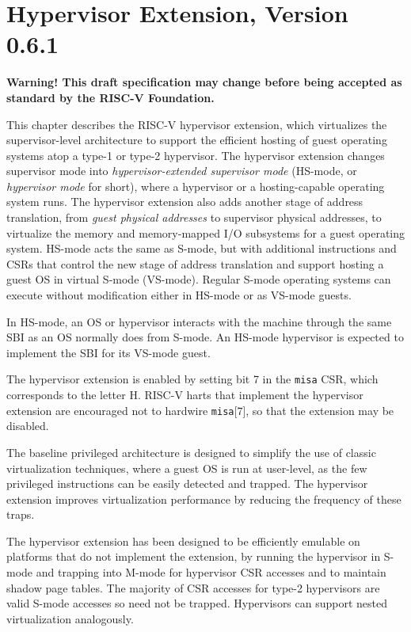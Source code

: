 \chapter{Hypervisor Extension, Version 0.6.1}
\label{hypervisor}

{\bf Warning! This draft specification may change before being
accepted as standard by the RISC-V Foundation.}

This chapter describes the RISC-V hypervisor extension, which virtualizes the
supervisor-level architecture to support the efficient hosting of guest
operating systems atop a type-1 or type-2 hypervisor.
The hypervisor extension changes supervisor mode into
{\em hypervisor-extended supervisor mode} (HS-mode, or {\em hypervisor
mode} for short), where a hypervisor or a hosting-capable operating system
runs.  The hypervisor extension also adds another stage of address translation,
from {\em guest physical addresses} to supervisor physical addresses,
to virtualize the
memory and memory-mapped I/O subsystems for a guest operating system.  HS-mode
acts the same as S-mode, but with additional instructions and CSRs that control
the new stage of address translation and support hosting a guest OS in virtual
S-mode (VS-mode).
Regular S-mode operating systems can execute without modification either in
HS-mode or as VS-mode guests.

In HS-mode, an OS or hypervisor interacts with the machine through the same
SBI as an OS normally does from S-mode.  An HS-mode hypervisor is expected to
implement the SBI for its VS-mode guest.

The hypervisor extension is enabled by setting bit 7 in the {\tt misa} CSR,
which corresponds to the letter H.
RISC-V harts that implement the hypervisor extension are encouraged
not to hardwire {\tt misa}[7], so that the extension may be disabled.

\begin{commentary}
The baseline privileged architecture is designed to simplify the use of classic
virtualization techniques, where a guest OS is run at user-level, as
the few privileged instructions can be easily detected and trapped.
The hypervisor extension improves virtualization performance by
reducing the frequency of these traps.

The hypervisor extension has been designed to be efficiently
emulable on platforms that do not implement the extension, by running
the hypervisor in S-mode and trapping into M-mode for hypervisor CSR accesses
and to maintain shadow page tables.  The majority of CSR accesses for
type-2 hypervisors are valid S-mode accesses so need not be trapped.
Hypervisors can support nested virtualization analogously.
\end{commentary}

